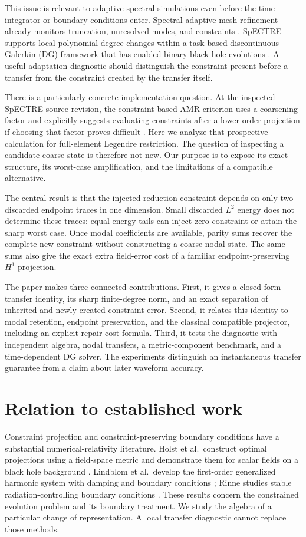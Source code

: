 \documentclass[11pt,a4paper]{article}
\theoremstyle{remark}\newtheorem{remark}[theorem]{Remark}
\begin{document}
This issue is relevant to adaptive spectral simulations even before the
time integrator or boundary conditions enter. Spectral adaptive mesh refinement
already monitors truncation, unresolved modes, and constraints
\cite{szilagyi2014}. SpECTRE supports local polynomial-degree changes within a
task-based discontinuous Galerkin (DG) framework \cite{kidder2017} that has
enabled binary black hole evolutions \cite{lovelace2025}. A useful adaptation
diagnostic should distinguish the constraint present before a transfer from the
constraint created by the transfer itself.

There is a particularly concrete implementation question. At the inspected
SpECTRE source revision, the constraint-based AMR criterion uses a coarsening
factor and explicitly suggests evaluating constraints after a lower-order
projection if choosing that factor proves difficult \cite{spectrecode}.
Here we analyze that prospective calculation for full-element Legendre
restriction. The question of inspecting a candidate coarse state is therefore
not new. Our purpose is to expose its exact structure, its worst-case
amplification, and the limitations of a compatible alternative.

The central result is that the injected reduction constraint depends on only
two discarded endpoint traces in one dimension. Small discarded \(L^2\) energy
does not determine these traces: equal-energy tails can inject zero constraint
or attain the sharp worst case. Once modal coefficients are available, parity
sums recover the complete new constraint without constructing a coarse nodal
state. The same sums also give the exact extra field-error cost of a familiar
endpoint-preserving \(H^1\) projection.

The paper makes three connected contributions. First, it gives a closed-form
transfer identity, its sharp finite-degree norm, and an exact separation of
inherited and newly created constraint error. Second, it relates this identity
to modal retention, endpoint preservation, and the classical compatible
projector, including an explicit repair-cost formula. Third, it tests the
diagnostic with independent algebra, nodal transfers, a metric-component
benchmark, and a time-dependent DG solver. The experiments distinguish an
instantaneous transfer guarantee from a claim about later waveform accuracy.

\section{Relation to established work}
Constraint projection and constraint-preserving boundary conditions have a
substantial numerical-relativity literature. Holst et al.\ construct optimal
projections using a field-space metric and demonstrate them for scalar fields
on a black hole background \cite{holst2004}. Lindblom et al.\ develop the
first-order generalized harmonic system with damping and boundary conditions
\cite{lindblom2006}; Rinne studies stable radiation-controlling boundary
conditions \cite{rinne2006}. These results concern the constrained evolution
problem and its boundary treatment. We study the algebra of a particular
change of representation. A local transfer diagnostic cannot replace those
methods.
\end{document}
